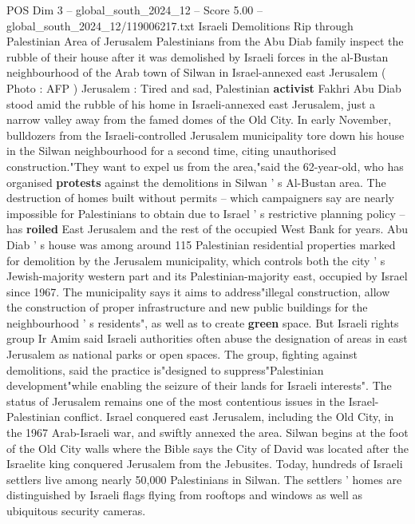 \begin{textsample}{POS Dim 3 – global\_south\_2024\_12 – Score 5.00 – global\_south\_2024\_12/119006217.txt}  \label{ex:f3_pos_397}
Israeli Demolitions Rip through Palestinian Area of Jerusalem Palestinians from the Abu Diab family inspect the rubble of their house after it was demolished by Israeli forces in the al-Bustan neighbourhood of the Arab town of Silwan in Israel-annexed east Jerusalem ( Photo : AFP ) Jerusalem : Tired and sad, Palestinian \textbf{activist} Fakhri Abu Diab stood amid the rubble of his home in Israeli-annexed east Jerusalem, just a narrow valley away from the famed domes of the Old City.
In early November, bulldozers from the Israeli-controlled Jerusalem municipality tore down his house in the Silwan neighbourhood for a second time, citing unauthorised construction."They want to expel us from the area,"said the 62-year-old, who has organised \textbf{protests} against the demolitions in Silwan ' s Al-Bustan area.
The destruction of homes built without permits -- which campaigners say are nearly impossible for Palestinians to obtain due to Israel ' s restrictive planning policy -- has \textbf{roiled} East Jerusalem and the rest of the occupied West Bank for years.
Abu Diab ' s house was among around 115 Palestinian residential properties marked for demolition by the Jerusalem municipality, which controls both the city ' s Jewish-majority western part and its Palestinian-majority east, occupied by Israel since 1967.
The municipality says it aims to address"illegal construction, allow the construction of proper infrastructure and new public buildings for the neighbourhood ' s residents", as well as to create \textbf{green} space.
But Israeli rights group Ir Amim said Israeli authorities often abuse the designation of areas in east Jerusalem as national parks or open spaces.
The group, fighting against demolitions, said the practice is"designed to suppress"Palestinian development"while enabling the seizure of their lands for Israeli interests".
The status of Jerusalem remains one of the most contentious issues in the Israel-Palestinian conflict.
Israel conquered east Jerusalem, including the Old City, in the 1967 Arab-Israeli war, and swiftly annexed the area.
Silwan begins at the foot of the Old City walls where the Bible says the City of David was located after the Israelite king conquered Jerusalem from the Jebusites.
Today, hundreds of Israeli settlers live among nearly 50,000 Palestinians in Silwan.
The settlers ' homes are distinguished by Israeli flags flying from rooftops and windows as well as ubiquitous security cameras.

\end{textsample}
